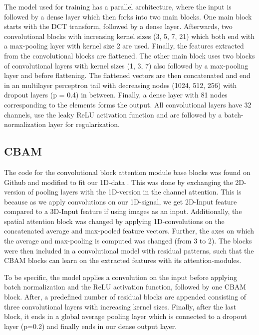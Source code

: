 The model used for training has a parallel architecture, where the input is followed by a dense layer which then forks into two main blocks. One main block starts with the DCT transform, followed by a dense layer. Afterwards, two convolutional blocks with increasing kernel sizes (3, 5, 7, 21) which both end with a max-pooling layer with kernel size 2 are used. Finally, the features extracted from the convolutional blocks are flattened.
The other main block uses two blocks of convolutional layers with kernel sizes (1, 3, 7) also followed by a max-pooling layer and before flattening. The flattened vectors are then concatenated and end in an multilayer perceptron tail with decreasing nodes (1024, 512, 256) with dropout layers (p = 0.4) in between. Finally, a dense layer with 81 nodes corresponding to the elements forms the output. All convolutional layers have 32 channels, use the leaky ReLU activation function and are followed by a batch-normalization layer for regularization.


\subsection{CBAM}
The code for the convolutional block attention module base blocks was found on Github and modified to fit our 1D-data \cite{mazzia__2023}. This was done by exchanging the 2D-version of pooling layers with the 1D-version in the channel attention. This is because as we apply convolutions on our 1D-signal, we get 2D-Input feature compared to a 3D-Input feature if using images as an input. Additionally, the spatial attention block was changed by applying 1D-convolutions on the concatenated average and max-pooled feature vectors. Further, the axes on which the average and max-pooling is computed was changed (from 3 to 2).
The blocks were then included in a convolutional model with residual patterns, such that the CBAM blocks can learn on the extracted features with its attention-modules. 

To be specific, the model applies a convolution on the input before applying batch normalization and the ReLU activation function, followed by one CBAM block. After, a predefined number of residual blocks are appended consisting of three convolutional layers with increasing kernel sizes.
Finally, after the last block, it ends in a global average pooling layer which is connected to a dropout layer (p=0.2) and finally ends in our dense output layer.

